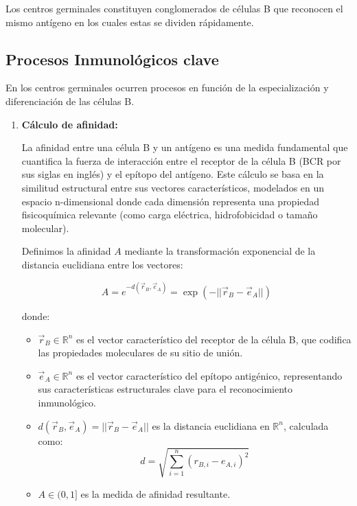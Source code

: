 Los centros germinales constituyen conglomerados de células B que reconocen el mismo antígeno en los cuales estas se dividen rápidamente.
\subsection*{Procesos Inmunológicos clave}
En los centros germinales ocurren procesos en función de la especialización y diferenciación de las células B.
\begin{enumerate}
    \item \textbf{Cálculo de afinidad:}

    La afinidad entre una célula B y un antígeno es una medida fundamental que cuantifica la fuerza de interacción entre el receptor de la célula B (BCR por sus siglas en inglés) y el epítopo del antígeno. Este cálculo se basa en la similitud estructural entre sus vectores característicos, modelados en un espacio n-dimensional donde cada dimensión representa una propiedad fisicoquímica relevante (como carga eléctrica, hidrofobicidad o tamaño molecular).

    Definimos la afinidad $A$ mediante la transformación exponencial de la distancia euclidiana entre los vectores:

    \begin{equation}
    A = e^{-d(\vec{r}_{B}, \vec{e}_{A})} = \exp\left({-||\vec{r}_{B} - \vec{e}_{A}||}\right)
    \end{equation}

    donde:
    \begin{itemize}
        \item $\vec{r}_B \in \mathbb{R}^n$ es el vector característico del receptor de la célula B, que codifica las propiedades moleculares de su sitio de unión.
        
        \item $\vec{e}_A \in \mathbb{R}^n$ es el vector característico del epítopo antigénico, representando sus características estructurales clave para el reconocimiento inmunológico.
        
        \item $d(\vec{r}_{B}, \vec{e}_{A}) = ||\vec{r}_{B} - \vec{e}_{A}||$ es la distancia euclidiana en $\mathbb{R}^n$, calculada como:
        \begin{equation}
        d = \sqrt{\sum_{i=1}^{n} (r_{B,i} - e_{A,i})^2}
        \end{equation}
        
        \item $A \in (0,1]$ es la medida de afinidad resultante.
    \end{itemize}


\end{enumerate}

